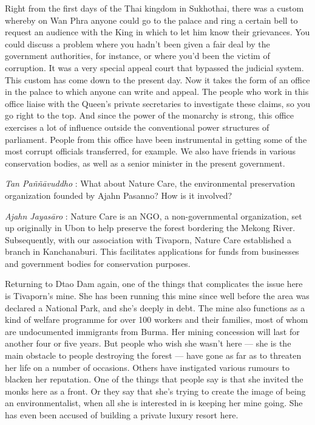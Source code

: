 Right from the first days of the Thai kingdom in Sukhothai, there was a
custom whereby on Wan Phra anyone could go to the palace and ring a
certain bell to request an audience with the King in which to let him
know their grievances. You could discuss a problem where you hadn't been
given a fair deal by the government authorities, for instance, or where
you'd been the victim of corruption. It was a very special appeal court
that bypassed the judicial system. This custom has come down to the
present day. Now it takes the form of an office in the palace to which
anyone can write and appeal. The people who work in this office liaise
with the Queen's private secretaries to investigate these claims, so you
go right to the top. And since the power of the monarchy is strong, this
office exercises a lot of influence outside the conventional power
structures of parliament. People from this office have been instrumental
in getting some of the most corrupt officials transferred, for example.
We also have friends in various conservation bodies, as well as a senior
minister in the present government.

\emph{Tan Paññāvuddho} : What about Nature Care, the environmental
preservation organization founded by Ajahn Pasanno? How is it involved?

\emph{Ajahn Jayasāro }: Nature Care is an NGO, a non-governmental
organization, set up originally in Ubon to help preserve the forest
bordering the Mekong River. Subsequently, with our association with
Tivaporn, Nature Care established a branch in Kanchanaburi. This
facilitates applications for funds from businesses and government bodies
for conservation purposes.

Returning to Dtao Dam again, one of the things that complicates the
issue here is Tivaporn's mine. She has been running this mine since well
before the area was declared a National Park, and she's deeply in debt.
The mine also functions as a kind of welfare programme for over 100
workers and their families, most of whom are undocumented immigrants
from Burma. Her mining concession will last for another four or five
years. But people who wish she wasn't here --- she is the main obstacle
to people destroying the forest --- have gone as far as to threaten her
life on a number of occasions. Others have instigated various rumours to
blacken her reputation. One of the things that people say is that she
invited the monks here as a front. Or they say that she's trying to
create the image of being an environmentalist, when all she is
interested in is keeping her mine going. She has even been accused of
building a private luxury resort here.

